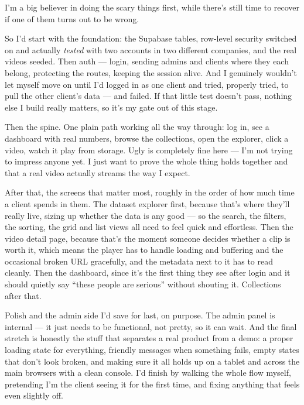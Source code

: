 \documentclass[a4paper,11pt]{article}
\begin{document}
I'm a big believer in doing the scary things first, while there's still time to recover if one of them turns out to be wrong.

So I'd start with the foundation: the Supabase tables, row-level security switched on and actually \textit{tested} with two accounts in two different companies, and the real videos seeded. Then auth --- login, sending admins and clients where they each belong, protecting the routes, keeping the session alive. And I genuinely wouldn't let myself move on until I'd logged in as one client and tried, properly tried, to pull the other client's data --- and failed. If that little test doesn't pass, nothing else I build really matters, so it's my gate out of this stage.

Then the spine. One plain path working all the way through: log in, see a dashboard with real numbers, browse the collections, open the explorer, click a video, watch it play from storage. Ugly is completely fine here --- I'm not trying to impress anyone yet. I just want to prove the whole thing holds together and that a real video actually streams the way I expect.

After that, the screens that matter most, roughly in the order of how much time a client spends in them. The dataset explorer first, because that's where they'll really live, sizing up whether the data is any good --- so the search, the filters, the sorting, the grid and list views all need to feel quick and effortless. Then the video detail page, because that's the moment someone decides whether a clip is worth it, which means the player has to handle loading and buffering and the occasional broken URL gracefully, and the metadata next to it has to read cleanly. Then the dashboard, since it's the first thing they see after login and it should quietly say ``these people are serious'' without shouting it. Collections after that.

Polish and the admin side I'd save for last, on purpose. The admin panel is internal --- it just needs to be functional, not pretty, so it can wait. And the final stretch is honestly the stuff that separates a real product from a demo: a proper loading state for everything, friendly messages when something fails, empty states that don't look broken, and making sure it all holds up on a tablet and across the main browsers with a clean console. I'd finish by walking the whole flow myself, pretending I'm the client seeing it for the first time, and fixing anything that feels even slightly off.
\end{document}
